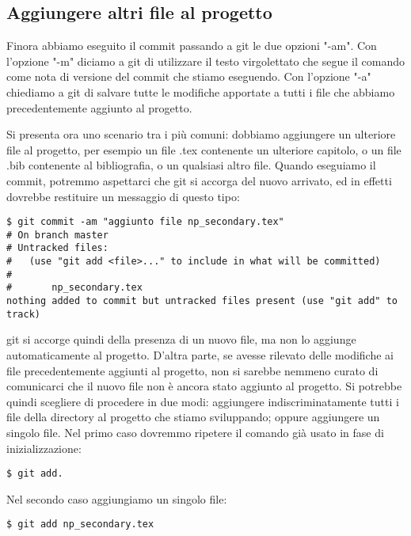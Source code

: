 \documentclass{article}
\begin{document}
\subsection{Aggiungere altri file al progetto}
Finora abbiamo eseguito il commit passando a git le due opzioni "-am".
Con l'opzione "-m" diciamo a git di utilizzare il testo virgolettato che segue
il comando come nota di versione del commit che stiamo eseguendo.
Con l'opzione "-a" chiediamo a git di salvare tutte le modifiche apportate a
tutti i file che abbiamo precedentemente aggiunto al progetto.

Si presenta ora uno scenario tra i più comuni: dobbiamo aggiungere un ulteriore
file al progetto, per esempio un file .tex contenente un ulteriore capitolo, o
un file .bib contenente al bibliografia, o un qualsiasi altro file.
Quando eseguiamo il commit, potremmo aspettarci che git si accorga del nuovo
arrivato, ed in effetti dovrebbe restituire un messaggio di questo tipo:

\begin{framed}
\begin{lstlisting}
$ git commit -am "aggiunto file np_secondary.tex"
# On branch master
# Untracked files:
#   (use "git add <file>..." to include in what will be committed)
#
#       np_secondary.tex
nothing added to commit but untracked files present (use "git add" to track)
\end{lstlisting}
\end{framed}

git si accorge quindi della presenza di un nuovo file, ma non lo aggiunge
automaticamente al progetto. D'altra parte, se avesse rilevato delle modifiche
ai file precedentemente aggiunti al progetto, non si sarebbe nemmeno curato di
comunicarci che il nuovo file non è ancora stato aggiunto al progetto.
Si potrebbe quindi scegliere di procedere in due modi: aggiungere
indiscriminatamente tutti i file della directory al progetto che stiamo
sviluppando; oppure aggiungere un singolo file.
Nel primo caso dovremmo ripetere il comando già usato in fase di
inizializzazione:

\begin{framed}
\begin{lstlisting}
$ git add.
\end{lstlisting}
\end{framed}

Nel secondo caso aggiungiamo un singolo file:

\begin{framed}
\begin{lstlisting}
$ git add np_secondary.tex
\end{lstlisting}
\end{framed}
\end{document}
